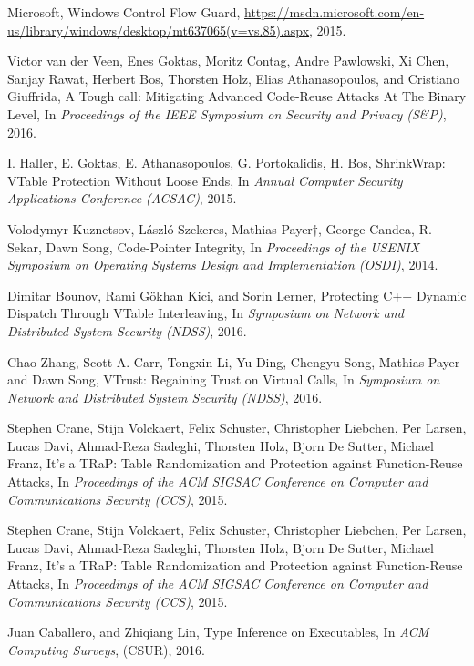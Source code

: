 \documentclass[11pt,a4paper,bibtotoc,idxtotoc,headsepline,footsepline,footexclude,BCOR12mm,DIV13]{scrbook}
\begin{document}
\begin{thebibliography}{50}
Microsoft,
{Windows Control Flow Guard},
\url{https://msdn.microsoft.com/en-us/library/windows/desktop/mt637065(v=vs.85).aspx}, 2015.

Victor van der Veen, Enes Goktas, Moritz Contag, Andre Pawlowski, Xi Chen, Sanjay Rawat, 
Herbert Bos, Thorsten Holz, Elias Athanasopoulos, and Cristiano Giuffrida,
{A Tough call: Mitigating Advanced Code-Reuse Attacks At The Binary Level}, In
\emph{Proceedings of the IEEE Symposium on Security and Privacy (S\&P)}, 2016.

I. Haller, E. Goktas, E. Athanasopoulos, G. Portokalidis, H. Bos,
{ ShrinkWrap: VTable Protection Without Loose Ends}, In
\emph{Annual Computer Security Applications Conference (ACSAC)}, 2015.

Volodymyr Kuznetsov, László Szekeres, Mathias Payer†, George Candea, R. Sekar, Dawn Song,
{Code-Pointer Integrity}, In
\emph{Proceedings of the USENIX Symposium on Operating Systems Design and Implementation (OSDI)}, 2014.

Dimitar Bounov, Rami Gökhan Kici, and Sorin Lerner,
{Protecting C++ Dynamic Dispatch Through VTable Interleaving}, In
\emph{Symposium on Network and Distributed System Security (NDSS)}, 2016.

Chao Zhang, Scott A. Carr, Tongxin Li, Yu Ding, Chengyu Song, Mathias Payer and Dawn Song,
{VTrust: Regaining Trust on Virtual Calls}, In
\emph{Symposium on Network and Distributed System Security (NDSS)}, 2016.

Stephen Crane, Stijn Volckaert, Felix Schuster, Christopher Liebchen, Per Larsen,
Lucas Davi, Ahmad-Reza Sadeghi, Thorsten Holz, Bjorn De Sutter, Michael Franz,
{It’s a TRaP: Table Randomization and Protection against Function-Reuse Attacks}, In
\emph{Proceedings of the ACM SIGSAC Conference on Computer and Communications Security (CCS)}, 2015.

Stephen Crane, Stijn Volckaert, Felix Schuster, Christopher Liebchen, Per Larsen,
Lucas Davi, Ahmad-Reza Sadeghi, Thorsten Holz, Bjorn De Sutter, Michael Franz,
{It’s a TRaP: Table Randomization and Protection against Function-Reuse Attacks}, In
\emph{Proceedings of the ACM SIGSAC Conference on Computer and Communications Security (CCS)}, 2015.

Juan Caballero, and Zhiqiang Lin,
{Type Inference on Executables}, In
\emph{ACM Computing Surveys}, (CSUR), 2016.


\end{thebibliography}
\end{document}
